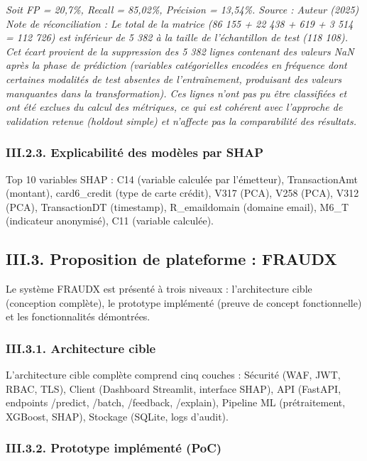 \documentclass[
  12pt,
]{article}
\begin{document}
\emph{Soit FP = 20,7\%, Recall = 85,02\%, Précision = 13,54\%. Source :
Auteur (2025)} \emph{Note de réconciliation : Le total de la matrice (86
155 + 22 438 + 619 + 3 514 = 112 726) est inférieur de 5 382 à la taille
de l’échantillon de test (118 108). Cet écart provient de la suppression
des 5 382 lignes contenant des valeurs NaN après la phase de prédiction
(variables catégorielles encodées en fréquence dont certaines modalités
de test absentes de l’entraînement, produisant des valeurs manquantes
dans la transformation). Ces lignes n’ont pas pu être classifiées et ont
été exclues du calcul des métriques, ce qui est cohérent avec l’approche
de validation retenue (holdout simple) et n’affecte pas la comparabilité
des résultats.}

\subsubsection{III.2.3. Explicabilité des modèles par
SHAP}\label{iii.2.3.-explicabilituxe9-des-moduxe8les-par-shap}

Top 10 variables SHAP : C14 (variable calculée par l’émetteur),
TransactionAmt (montant), card6\_credit (type de carte crédit), V317
(PCA), V258 (PCA), V312 (PCA), TransactionDT (timestamp), R\_emaildomain
(domaine email), M6\_T (indicateur anonymisé), C11 (variable calculée).

\subsection{III.3. Proposition de plateforme :
FRAUDX}\label{iii.3.-proposition-de-plateforme-fraudx}

Le système FRAUDX est présenté à trois niveaux : l’architecture cible
(conception complète), le prototype implémenté (preuve de concept
fonctionnelle) et les fonctionnalités démontrées.

\subsubsection{III.3.1. Architecture
cible}\label{iii.3.1.-architecture-cible}

L’architecture cible complète comprend cinq couches : Sécurité (WAF,
JWT, RBAC, TLS), Client (Dashboard Streamlit, interface SHAP), API
(FastAPI, endpoints /predict, /batch, /feedback, /explain), Pipeline ML
(prétraitement, XGBoost, SHAP), Stockage (SQLite, logs d’audit).

\subsubsection{III.3.2. Prototype implémenté
(PoC)}\label{iii.3.2.-prototype-impluxe9mentuxe9-poc}
\end{document}
